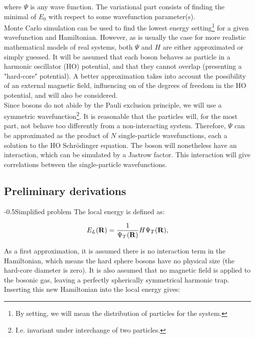 \documentclass[english, a4paper]{article}
\makeatletter
\renewcommand{\subsubsection}{\@startsection{subsubsection}{3}{0pt}%
{-\baselineskip}{0.5\baselineskip}{\bf\large}}
\makeatother
\begin{document}
where $\Psi$ is any wave function. The variational part consists of finding the minimal of $E_0$ with respect to some wavefunction parameter(s).\\
Monte Carlo simulation can be used to find the lowest energy setting\footnote{By setting, we will mean the distribution of particles for the system.} for a given wavefunction and Hamiltonian. However, as is usually the case for more realistic mathematical models of real systems, both $\Psi$ and $H$ are either approximated or simply guessed. It will be assumed that each boson behaves as particle in a harmonic oscillator (HO) potential, and that they cannot overlap (presenting a "hard-core" potential). A better approximation takes into account the possibility of an external magnetic field, influencing on of the degrees of freedom in the HO potential, and will also be considered.\\ 
Since bosons do not abide by the Pauli exclusion principle, we will use a symmetric wavefunction\footnote{I.e. invariant under interchange of two particles.}. It is reasonable that the particles will, for the most part, not behave too differently from a non-interacting system. Therefore, $\Psi$ can be approximated as the product of $N$ single-particle wavefunctions, each a solution to the HO Schr\"odinger equation. The boson will nonetheless have an interaction, which can be simulated by a Jastrow factor. This interaction will give correlations between the single-particle wavefunctions.

\subsection{Preliminary derivations}

\subsubsection{Simplified problem}
The local energy is defined as:

\begin{equation}
    E_L({\bf R})=\frac{1}{\Psi_T({\bf R})}H\Psi_T({\bf R}),
    \label{eq:locale}
\end{equation}

As a first approximation, it is assumed there is no interaction term in the Hamiltonian, which means the hard sphere bosons have no physical size (the hard-core diameter is zero). It is also assumed that no magnetic field is applied to the bosonic gas, leaving a perfectly spherically symmetrical harmonic trap. Inserting this new Hamiltonian into the local energy gives:
\end{document}
